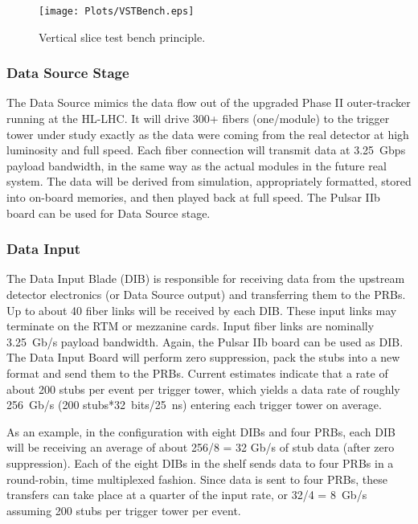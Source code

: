\begin{figure}[ht!]
\centering
\texttt{[image: Plots/VSTBench.eps]}
\caption{Vertical slice test bench principle.}
\label{fig:VS_TBench}
\end{figure}

\subsubsection{Data Source Stage}

\noindent The Data Source mimics the data flow out of the upgraded Phase II outer-tracker running at the HL-LHC. It will drive 300+ fibers (one/module) to the trigger tower under study exactly as the data were coming from the real detector at high luminosity and full speed. Each fiber connection will transmit data at 3.25~Gbps payload bandwidth, in the same way as the actual modules in the future real system. The data will be derived from simulation, appropriately formatted, stored into on-board memories, and then played back at full speed.  The Pulsar IIb board can be used for Data Source stage. 

\subsubsection{Data Input}

\noindent The Data Input Blade (DIB) is responsible for receiving data from the upstream detector electronics (or Data Source output) and transferring them to the PRBs. Up to about 40 fiber links will be received by each DIB. These input links may terminate on the RTM or mezzanine cards. Input fiber links are nominally 3.25~Gb/s payload bandwidth. Again, the Pulsar IIb board can be used as DIB. The Data Input Board will perform zero suppression, pack the stubs into a new format and send them to the PRBs. Current estimates indicate that a rate of about 200 stubs per event per trigger tower, which yields a data rate of roughly 256~Gb/s (200 stubs*32~bits/25~ns) entering each trigger tower on average.

\noindent As an example, in the configuration with eight DIBs and four PRBs, each DIB will be receiving an average of about 256/8 = 32 Gb/s of stub data (after zero suppression). Each of the eight DIBs in the shelf sends data to four PRBs in a round-robin, time multiplexed fashion. Since data is sent to four PRBs, these transfers can take place at a quarter of the input rate, or 32/4 = 8~Gb/s assuming 200 stubs per trigger tower per event.

